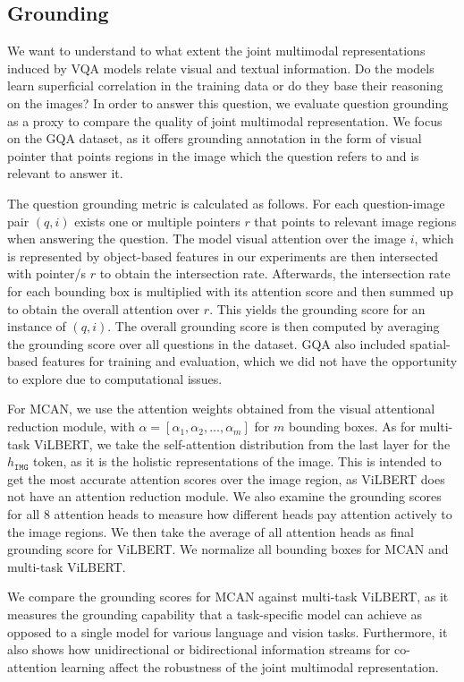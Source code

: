 \documentclass{article}
\begin{document}
\subsection{Grounding}
We want to understand to what extent the joint multimodal representations induced by VQA models relate visual and textual information. Do the models learn superficial correlation in the training data or do they base their reasoning on the images? In order to answer this question, we evaluate question grounding as a proxy to compare the quality of joint multimodal representation. We focus on the GQA dataset, as it offers grounding annotation in the form of visual pointer that points regions in the image which the question refers to and is relevant to answer it. 

The question grounding metric is calculated as follows. For each question-image pair $(q, i)$ exists one or multiple pointers $r$ that points to relevant image regions when answering the question. The model visual attention over the image $i$, which is represented by object-based features in our experiments are then intersected with pointer/s $r$ to obtain the intersection rate. Afterwards, the intersection rate for each bounding box is multiplied with its attention score and then summed up to obtain the overall attention over $r$. This yields the grounding score for an instance of $(q, i)$. The overall grounding score is then computed by averaging the grounding score over all questions in the dataset. GQA also included spatial-based features for training and evaluation, which we did not have the opportunity to explore due to computational issues.

For MCAN, we use the attention weights obtained from the visual attentional reduction module, with $\alpha = [\alpha_{1}, \alpha_{2}, \dots, \alpha_{m}]$ for $m$ bounding boxes. As for multi-task ViLBERT, we take the self-attention distribution from the last layer for the $h_{\mathtt{IMG}}$ token, as it is the holistic representations of the image. This is intended to get the most accurate attention scores over the image region, as ViLBERT does not have an attention reduction module. We also examine the grounding scores for all 8 attention heads to measure how different heads pay attention actively to the image regions. We then take the average of all attention heads as final grounding score for ViLBERT. We normalize all bounding boxes for MCAN and multi-task ViLBERT.

We compare the grounding scores for MCAN against multi-task ViLBERT, as it measures the grounding capability that a task-specific model can achieve as opposed to a single model for various language and vision tasks. Furthermore, it also shows how unidirectional or bidirectional information streams for co-attention learning affect the robustness of the joint multimodal representation.
\end{document}
